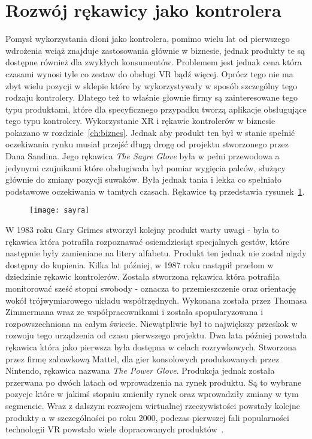 \section{Rozwój rękawicy jako kontrolera}
\label{sec:rozwojVR}
	Pomysł wykorzystania dłoni jako kontrolera, pomimo wielu lat od pierwszego wdrożenia wciąż znajduje zastosowania głównie w biznesie, jednak produkty te są dostępne również dla zwykłych konsumentów. Problemem jest jednak cena która czasami wynosi tyle co zestaw do obsługi VR bądź więcej. Oprócz tego nie ma zbyt wielu pozycji w sklepie które by wykorzystywały w sposób szczególny tego rodzaju kontrolery. Dlatego też to właśnie głownie firmy są zainteresowane tego typu produktami, które dla specyficznego przypadku tworzą aplikacje obsługujące tego typu kontrolery. Wykorzystanie XR i rękawic kontrolerów w biznesie pokazano w rozdziale~\ref{ch:biznes}. Jednak aby produkt ten był w stanie spełnić oczekiwania rynku musiał przejść długą drogę od projektu stworzonego przez Dana Sandina. Jego rękawica \textit{The Sayre Glove} była w pełni przewodowa a jedynymi czujnikami które obsługiwała był pomiar wygięcia palców, służący głównie do zmiany pozycji suwaków. Była jednak tania i lekka co spełniało podstawowe oczekiwania w tamtych czasach. Rękawice tą przedstawia rysunek~\ref{fig:sayra}.
\begin{figure}[h]
\centering
\texttt{[image: sayra]}
\label{fig:sayra}
\end{figure}
W 1983 roku Gary Grimes stworzył kolejny produkt warty uwagi - była to rękawica która potrafiła rozpoznawać osiemdziesiąt specjalnych gestów, które następnie były zamieniane na litery alfabetu. Produkt ten jednak nie został nigdy dostępny do kupienia. Kilka lat później, w 1987 roku nastąpił przełom w dziedzinie rękawic kontrolerów. Została stworzona rękawica która potrafiła monitorować sześć stopni swobody - oznacza to przemieszczenie oraz orientację wokół trójwymiarowego układu współrzędnych. Wykonana została przez Thomasa Zimmermana wraz ze współpracownikami i została spopularyzowana i rozpowszechniona na całym świecie. Niewątpliwie był to największy przeskok w rozwoju tego urządzenia od czasu pierwszego projektu. Dwa lata później powstała rękawica która jako pierwsza była dostępna w celach rozrywkowych. Stworzona przez firmę zabawkową Mattel, dla gier konsolowych produkowanych przez Nintendo, rękawica nazwana \textit{The Power Glove}. Produkcja jednak została przerwana po dwóch latach od wprowadzenia na rynek produktu. Są to wybrane pozycje które w jakimś stopniu zmieniły rynek oraz wprowadziły zmiany w tym segmencie. Wraz z dalszym rozwojem wirtualnej rzeczywistości powstały kolejne produkty a w szczególności po roku 2000, podczas pierwszej fali popularności technologii VR powstało wiele dopracowanych produktów~\cite{ewolucja}. 
